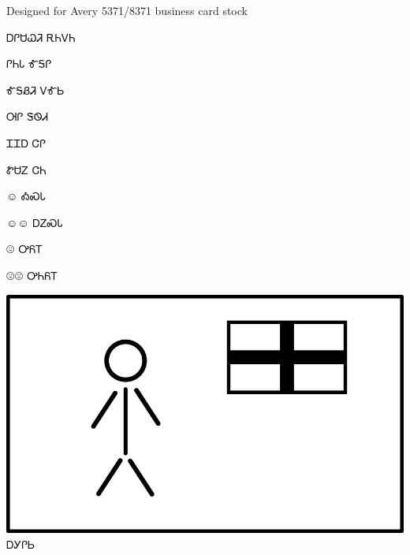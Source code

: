 \documentclass[avery5371]{flashcards}%
\begin{document}
Designed for Avery 5371/8371 business card stock


\begin{flashcard}{\Huge ᎠᎵᏌᏇᏘ}
\textbf{\Huge} ᎡᏂᏙᏂ
\end{flashcard}

\begin{flashcard}{\Huge ᎵᏂᏓ}
\textbf{\Huge} ᎹᎦᎵ
\end{flashcard}

\begin{flashcard}{\Huge ᎹᎦᏰᏘ}
\textbf{\Huge} ᏙᎹᏏ
\end{flashcard}

\begin{flashcard}{\Huge ᎺᎵ}
\textbf{\Huge} ᏕᏫᏗ
\end{flashcard}

\begin{flashcard}{\Huge ᏆᏆᎠ}
\textbf{\Huge} ᏣᎵ
\end{flashcard}

\begin{flashcard}{\Huge ᏑᏌᏃ}
\textbf{\Huge} ᏣᏂ
\end{flashcard}


\begin{flashcard}{\normalfont\Huge\fontsize{128pt}{128pt}\selectfont ☺}
\Huge ᎣᏍᏓ
\end{flashcard}

\begin{flashcard}{\normalfont\Huge\fontsize{128pt}{128pt}\selectfont ☺☺}
\Huge ᎠᏃᏍᏓ
\end{flashcard}

\begin{flashcard}{\normalfont\Huge\fontsize{128pt}{128pt}\selectfont ☹}
\Huge ᎤᏲᎢ
\end{flashcard}

\begin{flashcard}{\normalfont\Huge\fontsize{128pt}{128pt}\selectfont ☹☹}
\Huge ᎤᏂᏲᎢ
\end{flashcard}


\begin{flashcard}{
\includegraphics[width=0.95\columnwidth,height=.51\columnwidth,keepaspectratio]{../artwork/flags/agilisi-flag}
}
\Huge ᎠᎩᎵᏏ
\end{flashcard}
\end{document}
